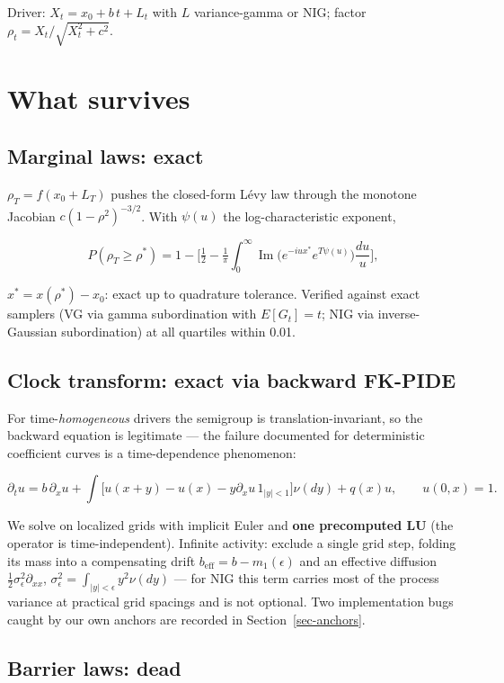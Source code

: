 \documentclass[
  english,
  10pt,
  letterpaper,
  DIV=11,
  numbers=noendperiod]{scrartcl}
\begin{document}
Driver: \(X_t=x_0+b\,t+L_t\) with \(L\) variance-gamma or NIG; factor
\(\rho_t=X_t/\sqrt{X_t^2+c^2}\).

\section{What survives}\label{sec-survival}

\subsection{Marginal laws: exact}\label{marginal-laws-exact}

\(\rho_T=f(x_0+L_T)\) pushes the closed-form Lévy law through the
monotone Jacobian \(c(1-\rho^2)^{-3/2}\). With \(\psi(u)\) the
log-characteristic exponent,

\[
P(\rho_T\ge\rho^*)=1-\Big[\tfrac12-\tfrac1\pi\int_0^\infty
\operatorname{Im}\big(e^{-iu x^*}e^{T\psi(u)}\big)\frac{du}{u}\Big],
\]

\(x^*=x(\rho^*)-x_0\): exact up to quadrature tolerance. Verified
against exact samplers (VG via gamma subordination with \(E[G_t]=t\);
NIG via inverse-Gaussian subordination) at all quartiles within 0.01.

\subsection{Clock transform: exact via backward
FK-PIDE}\label{clock-transform-exact-via-backward-fk-pide}

For time-\emph{homogeneous} drivers the semigroup is
translation-invariant, so the backward equation is legitimate --- the
failure documented for deterministic coefficient curves is a
time-dependence phenomenon:

\[
\partial_tu=b\,\partial_xu+\int\!\big[u(x+y)-u(x)-y\partial_xu\,
1_{|y|<1}\big]\nu(dy)+q(x)u,\qquad u(0,x)=1 .
\]

We solve on localized grids with implicit Euler and \textbf{one
precomputed LU} (the operator is time-independent). Infinite activity:
exclude a single grid step, folding its mass into a compensating drift
\(b_{\text{eff}}=b-m_1(\epsilon)\) and an effective diffusion
\(\tfrac12\sigma_\epsilon^2\partial_{xx}\),
\(\sigma_\epsilon^2=\int_{|y|<\epsilon}y^2\nu(dy)\) --- for NIG this
term carries most of the process variance at practical grid spacings and
is not optional. Two implementation bugs caught by our own anchors are
recorded in Section~\ref{sec-anchors}.

\subsection{Barrier laws: dead}\label{barrier-laws-dead}
\end{document}
